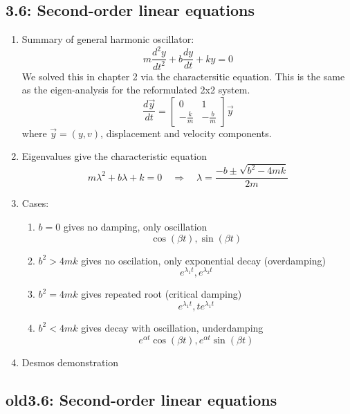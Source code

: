 \documentclass{article}
\begin{document}
\subsection{3.6: Second-order linear equations}
\begin{enumerate}
\item Summary of general harmonic oscillator:
\[
m \frac{d^2y}{dt^2} + b \frac{dy}{dt} + ky = 0
\]
We solved this in chapter 2 via the charactersitic equation. This is the same as the eigen-analysis for the reformulated 2x2 system.
\[
\frac{d\vec{y}}{dt} = \begin{bmatrix}
0 & 1 \\
-\frac{k}{m} & -\frac{b}{m}
\end{bmatrix} \vec{y}
\]
where $\vec{y} = (y,v)$, displacement and velocity components.

\item Eigenvalues give the characteristic equation
\[
m\lambda^2 + b\lambda + k = 0 \quad \Rightarrow \quad
\lambda = \frac{-b \pm \sqrt{b^2-4mk}}{2m}
\]

\item Cases:
\begin{enumerate}
\item $b=0$ gives no damping, only oscillation
\[
\cos(\beta t), \sin(\beta t)
\]

\item $b^2>4mk$ gives no oscilation, only exponential decay (overdamping)
\[
e^{\lambda_1 t}, e^{\lambda_2 t}
\]

\item $b^2=4mk$ gives repeated root (critical damping)
\[
e^{\lambda_1 t}, te^{\lambda_1 t}
\]

\item $b^2 < 4mk$ gives decay with oscillation, underdamping
\[
e^{\alpha t}\cos(\beta t), e^{\alpha t}\sin(\beta t)
\]
\end{enumerate}

\item Desmos demonstration
\end{enumerate}

\subsection{old3.6: Second-order linear equations}
\end{document}
